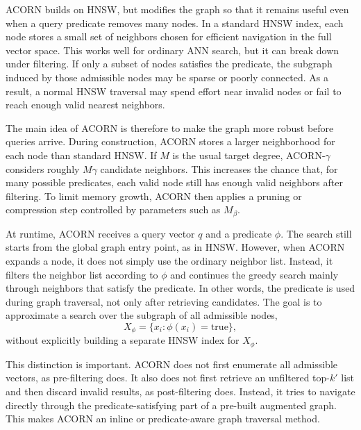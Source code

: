 ACORN builds on HNSW, but modifies the graph so that it remains useful even when a query predicate removes many nodes.
In a standard HNSW index, each node stores a small set of neighbors chosen for efficient navigation in the full vector space.
This works well for ordinary ANN search, but it can break down under filtering.
If only a subset of nodes satisfies the predicate, the subgraph induced by those admissible nodes may be sparse or poorly connected.
As a result, a normal HNSW traversal may spend effort near invalid nodes or fail to reach enough valid nearest neighbors.

The main idea of ACORN is therefore to make the graph more robust before queries arrive.
During construction, ACORN stores a larger neighborhood for each node than standard HNSW.
If \(M\) is the usual target degree, ACORN-\(\gamma\) considers roughly \(M\gamma\) candidate neighbors.
This increases the chance that, for many possible predicates, each valid node still has enough valid neighbors after filtering.
To limit memory growth, ACORN then applies a pruning or compression step controlled by parameters such as \(M_\beta\).

At runtime, ACORN receives a query vector \(q\) and a predicate \(\phi\).
The search still starts from the global graph entry point, as in HNSW.
However, when ACORN expands a node, it does not simply use the ordinary neighbor list.
Instead, it filters the neighbor list according to \(\phi\) and continues the greedy search mainly through neighbors that satisfy the predicate.
In other words, the predicate is used during graph traversal, not only after retrieving candidates.
The goal is to approximate a search over the subgraph of all admissible nodes,
\[
X_\phi = \{x_i : \phi(x_i) = \mathrm{true}\},
\]
without explicitly building a separate HNSW index for \(X_\phi\).

This distinction is important.
ACORN does not first enumerate all admissible vectors, as pre-filtering does.
It also does not first retrieve an unfiltered top-\(k'\) list and then discard invalid results, as post-filtering does.
Instead, it tries to navigate directly through the predicate-satisfying part of a pre-built augmented graph.
This makes ACORN an inline or predicate-aware graph traversal method.